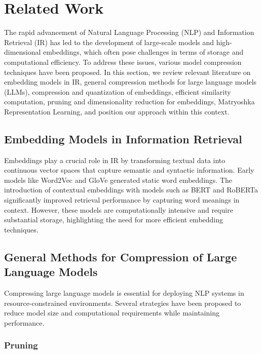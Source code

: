 

\section{Related Work}  
\label{sec:related_work}  
  
The rapid advancement of Natural Language Processing (NLP) and Information Retrieval (IR) has led to the development of large-scale models and high-dimensional embeddings, which often pose challenges in terms of storage and computational efficiency. To address these issues, various model compression techniques have been proposed. In this section, we review relevant literature on embedding models in IR, general compression methods for large language models (LLMs), compression and quantization of embeddings, efficient similarity computation, pruning and dimensionality reduction for embeddings, Matryoshka Representation Learning, and position our approach within this context.  
  
\subsection{Embedding Models in Information Retrieval}  
  
Embeddings play a crucial role in IR by transforming textual data into continuous vector spaces that capture semantic and syntactic information. Early models like Word2Vec \cite{mikolov2013distributed} and GloVe \cite{pennington2014glove} generated static word embeddings. The introduction of contextual embeddings with models such as BERT \cite{devlin2019bert} and RoBERTa \cite{liu2019roberta} significantly improved retrieval performance by capturing word meanings in context. However, these models are computationally intensive and require substantial storage, highlighting the need for more efficient embedding techniques.  
  
\subsection{General Methods for Compression of Large Language Models}  
  
Compressing large language models is essential for deploying NLP systems in resource-constrained environments. Several strategies have been proposed to reduce model size and computational requirements while maintaining performance.  
  
\subsubsection{Pruning}  
  
